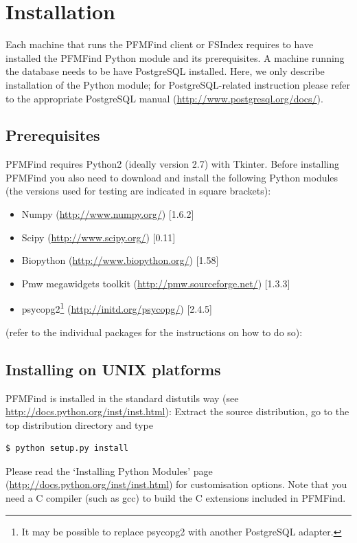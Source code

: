 \documentclass[10pt,letter]{article}
\begin{document}
\section{Installation}

Each machine that runs the PFMFind client or FSIndex requires to have installed the PFMFind Python module and its prerequisites. A machine running the database needs to be have PostgreSQL installed. Here, we only describe installation of the Python module; for PostgreSQL-related instruction please refer to the appropriate PostgreSQL manual (\url{http://www.postgresql.org/docs/}).

\subsection{Prerequisites}
PFMFind requires Python2 (ideally version 2.7) with Tkinter. Before installing PFMFind you also need to download and install the following Python modules (the versions used for testing are indicated in square brackets):

\begin{itemize}
\item Numpy (\url{http://www.numpy.org/}) [1.6.2]
\item Scipy (\url{http://www.scipy.org/}) [0.11]
\item Biopython (\url{http://www.biopython.org/}) [1.58]
\item Pmw megawidgets toolkit (\url{http://pmw.sourceforge.net/}) [1.3.3]
\item psycopg2\footnote{It may be possible to replace psycopg2 with another PostgreSQL adapter.} (\url{http://initd.org/psycopg/}) [2.4.5]
\end{itemize}

(refer to the individual packages for the instructions on how to do so):

\subsection{Installing on UNIX platforms}

PFMFind is installed in the standard distutils way (see \url{http://docs.python.org/inst/inst.html}): Extract the source distribution, go to the top distribution directory and type
\begin{verbatim}
$ python setup.py install
\end{verbatim}
Please read the `Installing Python Modules' page (\url{http://docs.python.org/inst/inst.html}) for 
customisation options. Note that you need a C compiler (such as gcc) to build the C extensions included in PFMFind.
\end{document}
